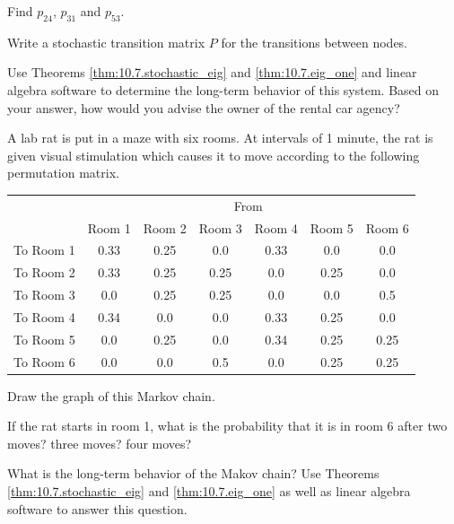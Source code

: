 \begin{problem}
    \ba
        \item Find $p_{24}$, $p_{31}$ and $p_{53}$.
        \item Write a stochastic transition matrix $P$ for the transitions between nodes.
        \item Use Theorems \ref{thm:10.7.stochastic_eig} and \ref{thm:10.7.eig_one} and
            linear algebra software to determine the long-term behavior of this system.
            Based on your answer, how would you advise the owner of the rental car agency?
    \ea

\end{problem}

% 
% 
\begin{problem}
A lab rat is put in a maze with six rooms.  At intervals of 1 minute, the rat is given
visual stimulation which causes it to move according to the following permutation matrix.
\begin{center}
    \begin{tabular}{c|cccccc}
        & \multicolumn{6}{c}{From} \\
                  & Room 1  & Room 2 & Room 3 & Room 4 & Room 5 & Room 6 \\ \hline
        To Room 1 & 0.33    & 0.25   & 0.0    & 0.33   & 0.0    & 0.0  \\
        To Room 2 & 0.33    & 0.25   & 0.25   & 0.0    & 0.25   & 0.0  \\
        To Room 3 & 0.0     & 0.25   & 0.25   & 0.0    & 0.0    & 0.5  \\
        To Room 4 & 0.34    & 0.0    & 0.0    & 0.33   & 0.25   & 0.0  \\
        To Room 5 & 0.0     & 0.25   & 0.0    & 0.34   & 0.25   & 0.25  \\
        To Room 6 & 0.0     & 0.0    & 0.5    & 0.0    & 0.25   & 0.25  \\
    \end{tabular}
\end{center}

\ba
    \item Draw the graph of this Markov chain.
    \item If the rat starts in room 1, what is the probability that it is in room 6 after
        two moves?  three moves? four moves?
    \item What is the long-term behavior of the Makov chain? Use Theorems
        \ref{thm:10.7.stochastic_eig} and \ref{thm:10.7.eig_one} as well as linear algebra
        software to answer this question.
\ea

\end{problem}


